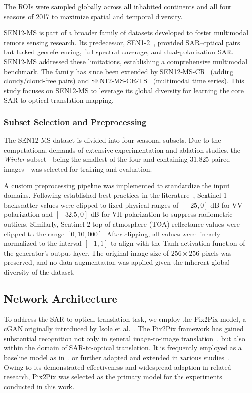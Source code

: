 The ROIs were sampled globally across all inhabited continents and all four seasons of 2017 to maximize spatial and temporal diversity. 


SEN12-MS is part of a broader family of datasets developed to foster multimodal remote sensing research. Its predecessor, SEN1-2~\cite{sen12_2018}, provided SAR–optical pairs but lacked georeferencing, full spectral coverage, and dual-polarization SAR. SEN12-MS addressed these limitations, establishing a comprehensive multimodal benchmark. The family has since been extended by SEN12-MS-CR~\cite{sen12ms-cr_2021} (adding cloudy/cloud-free pairs) and SEN12-MS-CR-TS~\cite{sen12ms-cr-ts_2022} (multimodal time series). This study focuses on SEN12-MS to leverage its global diversity for learning the core SAR-to-optical translation mapping.

\subsubsection{Subset Selection and Preprocessing}
\label{subsec:preprocessing}
The SEN12-MS dataset is divided into four seasonal subsets. Due to the computational demands of extensive experimentation and ablation studies, the \textit{Winter} subset—being the smallest of the four and containing 31,825 paired images—was selected for training and evaluation.

A custom preprocessing pipeline was implemented to standardize the input domains. Following established best practices in the literature~\cite{CR_SEN2_dRNN, c_guided_fus_s2ot, trans_gan_CF, strgb_lat_diff, transfusion_cr}, Sentinel-1 backscatter values were clipped to fixed physical ranges of $[-25, 0]$ dB for VV polarization and $[-32.5, 0]$ dB for VH polarization to suppress radiometric outliers. Similarly, Sentinel-2 top-of-atmosphere (TOA) reflectance values were clipped to the range $[0, 10,000]$. After clipping, all values were linearly normalized to the interval $[-1, 1]$ to align with the Tanh activation function of the generator's output layer. The original image size of $256 \times 256$ pixels was preserved, and no data augmentation was applied given the inherent global diversity of the dataset.

\subsection{Network Architecture}
To address the SAR-to-optical translation task, we employ the Pix2Pix model, a cGAN originally introduced by Isola et al.~\cite{pix2pix_2018}. The Pix2Pix framework has gained substantial recognition not only in general image-to-image translation~\cite{S2MS_GAN}, but also within the domain of SAR-to-optical translation. It is frequently employed as a baseline model as in~\cite{s2opt_LULC, assessing_MT_cGANS_s2o_crop, CR_SEN2_dRNN, cr_fuse_HR_GEN, hvt_cgan, trans_gan_CF}, or further adapted and extended in various studies~\cite{A_cGAN_fuse_sar_MS_CR, s2opt_LULC}. Owing to its demonstrated effectiveness and widespread adoption in related research, Pix2Pix was selected as the primary model for the experiments conducted in this work.

